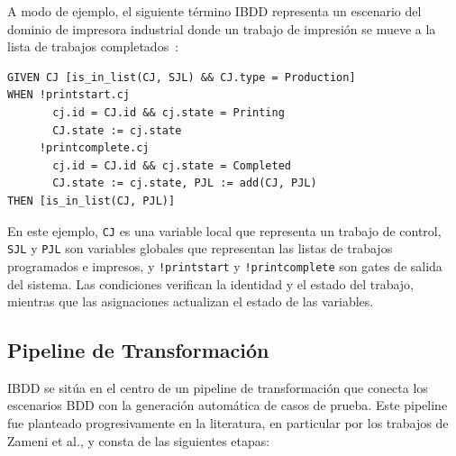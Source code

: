 A modo de ejemplo, el siguiente término IBDD representa un escenario del dominio de impresora industrial donde un trabajo de impresión se mueve a la lista de trabajos completados~\cite{zameni2024ibdd}:
\begin{samepage}
\begin{center}
\begin{minipage}{0.95\textwidth}
\captionsetup{type=lstlisting}
\caption{Ejemplo de un término IBDD para un escenario de impresora industrial}
\label{lst:ibdd-example}
\begin{lstlisting}
GIVEN CJ [is_in_list(CJ, SJL) && CJ.type = Production]
WHEN !printstart.cj
       cj.id = CJ.id && cj.state = Printing
       CJ.state := cj.state
     !printcomplete.cj
       cj.id = CJ.id && cj.state = Completed
       CJ.state := cj.state, PJL := add(CJ, PJL)
THEN [is_in_list(CJ, PJL)]
\end{lstlisting}
\end{minipage}
\end{center}
\end{samepage}

En este ejemplo, \texttt{CJ} es una variable local que representa un trabajo de control, \texttt{SJL} y \texttt{PJL} son variables globales que representan las listas de trabajos programados e impresos, y \texttt{!printstart} y \texttt{!printcomplete} son gates de salida del sistema. Las condiciones verifican la identidad y el estado del trabajo, mientras que las asignaciones actualizan el estado de las variables.

\subsection{Pipeline de Transformación}

IBDD se sitúa en el centro de un pipeline de transformación que conecta los escenarios BDD con la generación automática de casos de prueba. Este pipeline fue planteado progresivamente en la literatura, en particular por los trabajos de Zameni et al., y consta de las siguientes etapas:

